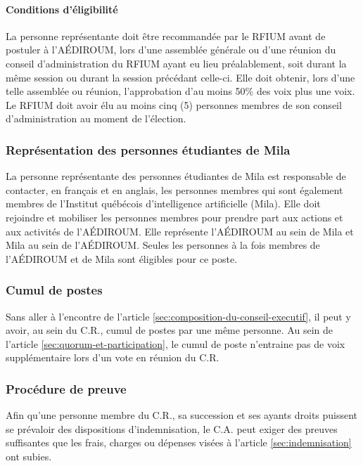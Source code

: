 \documentclass{aediroum}
\newcommand{\article}[1]{article \ref{#1}}
\begin{document}
\paragraph{Conditions d'éligibilité}

La personne représentante doit être recommandée par le
RFIUM avant de postuler à l’AÉDIROUM, lors d’une assemblée générale ou d’une réunion du conseil d’administration du RFIUM ayant eu lieu préalablement, soit durant la même session ou durant la session précédant celle-ci. Elle doit obtenir, lors d’une telle
assemblée ou réunion, l’approbation d’au moins 50\% des voix plus une voix. Le RFIUM doit avoir élu au moins cinq (5) personnes membres de son conseil d’administration au moment de l’élection.

\subsubsection{Représentation des personnes étudiantes de Mila}
La personne représentante des personnes étudiantes de Mila est responsable de contacter,
en français et en anglais, les personnes membres qui sont également membres de
l’Institut québécois d’intelligence artificielle (Mila). Elle doit rejoindre et mobiliser les
personnes membres pour prendre part aux actions et aux activités de l’AÉDIROUM. Elle
représente l’AÉDIROUM au sein de Mila et Mila au sein de l’AÉDIROUM. Seules les
personnes à la fois membres de l’AÉDIROUM et de Mila sont éligibles pour ce poste.

\subsubsection{Cumul de postes}\label{sec:cumul-de-postes}

Sans aller à l'encontre de l'\article{sec:composition-du-conseil-executif}, il peut y avoir, au sein du C.R., cumul de postes par une même personne. Au sein de l'\article{sec:quorum-et-participation}, le cumul de poste n'entraine pas de voix supplémentaire lors d'un vote en réunion du C.R.

\subsubsection{Procédure de preuve}\label{sec:procedure-de-preuve}

Afin qu'une personne membre du C.R., sa succession et ses ayants droits puissent se prévaloir des dispositions d'indemnisation, le C.A. peut exiger des preuves suffisantes que les frais, charges ou dépenses visées à l'\article{sec:indemnisation} ont subies.
\end{document}
